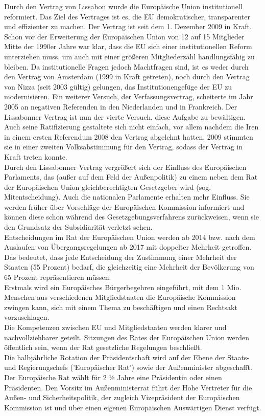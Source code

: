 \documentclass[letterpaper, 12pt]{article}
\begin{document}
Durch den Vertrag von Lissabon wurde die Europäische Union institutionell reformiert. Das Ziel des Vertrages ist es, die EU demokratischer, transparenter und effizienter zu machen. Der Vertrag ist seit dem 1. Dezember 2009 in Kraft. \\
Schon vor der Erweiterung der Europäischen Union von 12 auf 15 Mitglieder Mitte der 1990er Jahre war klar, dass die EU sich einer institutionellen Reform unterziehen muss, um auch mit einer größeren Mitgliederzahl handlungsfähig zu bleiben. Da institutionelle Fragen jedoch Machtfragen sind, ist es weder durch den Vertrag von Amsterdam (1999 in Kraft getreten), noch durch den Vertrag von Nizza (seit 2003 gültig) gelungen, das Institutionengefüge der EU zu modernisieren. Ein weiterer Versuch, der Verfassungsvertrag, scheiterte im Jahr 2005 an negativen Referenden in den Niederlanden und in Frankreich. Der Lissabonner Vertrag ist nun der vierte Versuch, diese Aufgabe zu bewältigen. Auch seine Ratifizierung gestaltete sich nicht einfach, vor allem nachdem die Iren in einem ersten Referendum 2008 den Vertrag abgelehnt hatten. 2009 stimmten sie in einer zweiten Volksabstimmung für den Vertrag, sodass der Vertrag in Kraft treten konnte. \\
Durch den Lissabonner Vertrag vergrößert sich der Einfluss des Europäischen Parlaments, das (außer auf dem Feld der Außenpolitik) zu einem neben dem Rat der Europäischen Union gleichberechtigten Gesetzgeber wird (sog. Mitentscheidung). Auch die nationalen Parlamente erhalten mehr Einfluss. Sie werden früher über Vorschläge der Europäischen Kommission informiert und können diese schon während des Gesetzgebungsverfahrens zurückweisen, wenn sie den Grundsatz der Subsidiarität verletzt sehen. \\
Entscheidungen im Rat der Europäischen Union werden ab 2014 bzw. nach dem Auslaufen von Übergangsregelungen ab 2017 mit doppelter Mehrheit getroffen. Das bedeutet, dass jede Entscheidung der Zustimmung einer Mehrheit der Staaten (55 Prozent) bedarf, die gleichzeitig eine Mehrheit der Bevölkerung von 65 Prozent repräsentieren müssen. \\
Erstmals wird ein Europäisches Bürgerbegehren eingeführt, mit dem 1 Mio. Menschen aus verschiedenen Mitgliedstaaten die Europäische Kommission zwingen kann, sich mit einem Thema zu beschäftigen und einen Rechtsakt vorzuschlagen. \\
Die Kompetenzen zwischen EU und Mitgliedstaaten werden klarer und nachvollziehbarer geteilt. Sitzungen des Rates der Europäischen Union werden öffentlich sein, wenn der Rat gesetzliche Regelungen beschließt. \\
Die halbjährliche Rotation der Präsidentschaft wird auf der Ebene der Staats- und Regierungschefs ('Europäischer Rat') sowie der Außenminister abgeschafft. Der Europäische Rat wählt für 2 ½ Jahre eine Präsidentin oder einen Präsidenten. Den Vorsitz im Außenministerrat führt der Hohe Vertreter für die Außen- und Sicherheitspolitik, der zugleich Vizepräsident der Europäischen Kommission ist und über einen eigenen Europäischen Auswärtigen Dienst verfügt. 

\clearpage


\end{document}
